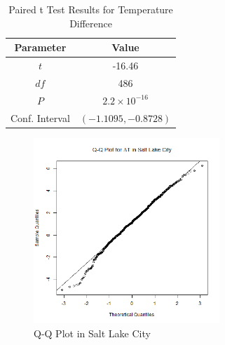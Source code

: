 \begin{table}[ht]
 \begin{centering}
 \caption{Temperature Difference Statistics}
 \label{tab:temp_diffs}
 \end{centering}
\end{table}

\begin{table}[ht]
 \begin{centering}
 \begin{tabular}{|c|c|} 
  \hline
  Parameter & Value \\
  \hline\hline
  $t$ & -16.46 \\ 
 \hline
 $df$ & 486 \\
  \hline
 $P$ & $2.2 \times 10^{-16}$ \\ 
  \hline
 Conf. Interval & $(-1.1095, -0.8728)$ \\ 
 \hline
 \end{tabular}
 \caption{Paired t Test Results for Temperature Difference}
 \label{tab:t_test_results}
 \end{centering}
\end{table}

\begin{figure}
  \centering
  \includegraphics[width=7cm]{../data/img/Salt_Lake_Diff_QQ_Plot.PNG}
  \caption{Q-Q Plot in Salt Lake City}
  \label{fig:slc_diff_qqplot}
\end{figure}

